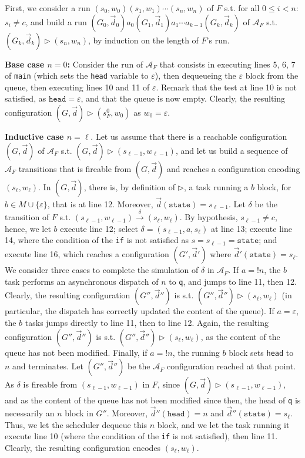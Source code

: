 \documentclass[runningheads,oribibl,]{article}
\newcommand{\Aa}{\ensuremath{\mathcal{A}}\xspace}
\newcommand{\e}{\ensuremath{\varepsilon}\xspace}
\newcommand{\Graph}{\ensuremath{G}}
\newcommand{\Data}{\ensuremath{\vec{d}}}
\newenvironment{proof}{\noindent{\it Proof.\hspace*{.5cm}}}{}
\begin{document}
\begin{proof}
  First, we consider a run $(s_0,w_0)(s_1,w_1)\cdots(s_n,w_n)$ of $F$
  s.t. for all $0\leq i<n$: $s_i\neq c$, and build a run
  $(\Graph_0,\Data_0)a_0(\Graph_1,\Data_1)a_1\cdots
  a_{k-1}(\Graph_k,\Data_k)$ of $\Aa_F$
  s.t. $(\Graph_k,\Data_k)\rhd(s_n,w_n)$, by induction on the length
  of $F$'s run.

  \textbf{Base case $n=0$:} Consider the run of $\Aa_F$ that consists
  in executing lines 5, 6, 7 of \texttt{main} (which sets the
  \texttt{head} variable to $\e$), then dequeueing the $\e$ block from
  the queue, then executing lines 10 and 11 of $\e$. Remark that the
  test at line 10 is not satisfied, as $\mathtt{head}=\e$, and that
  the queue is now empty. Clearly, the resulting configuration
  $(\Graph,\Data)\rhd(s^0_F,w_0)$ as $w_0=\e$.

  \textbf{Inductive case $n=\ell$}. Let us assume that there is a
  reachable configuration $(\Graph, \Data)$ of $\Aa_F$
  s.t. $(\Graph,\Data)\rhd (s_{\ell-1}, w_{\ell-1})$, and let us build
  a sequence of $\Aa_F$ transitions that is fireable from
  $(\Graph,\Data)$ and reaches a configuration encoding
  $(s_\ell,w_\ell)$. In $(\Graph,\Data)$, there is, by definition of
  $\rhd$, a task running a $b$ block, for $b\in M\cup\{\e\}$, that is
  at line 12. Moreover, $\Data(\mathtt{state})=s_{\ell-1}$. Let
  $\delta$ be the transition of $F$
  s.t. $(s_{\ell-1},w_{\ell-1})\xrightarrow{\delta}(s_\ell,w_\ell)$. By
  hypothesis, $s_{\ell-1}\neq c$, hence, we let $b$ execute line 12;
  select $\delta=(s_{\ell-1},a,s_\ell)$ at line 13; execute line 14,
  where the condition of the \texttt{if} is not satisfied as
  $s=s_{\ell-1}=\mathtt{state}$; and execute line 16, which reaches a
  configuration $(\Graph',\Data')$ where
  $\Data'(\mathtt{state})=s_\ell$. We consider three cases to complete
  the simulation of $\delta$ in $\Aa_F$. If $a=!n$, the $b$ task
  performs an asynchronous dispatch of $n$ to \texttt{q}, and jumps to
  line 11, then 12. Clearly, the resulting configuration
  $(\Graph'',\Data'')$ is s.t. $(\Graph'',\Data'')\rhd(s_\ell,w_\ell)$
  (in particular, the dispatch has correctly updated the content of
  the queue). If $a=\e$, the $b$ tasks jumps directly to line 11, then
  to line 12. Again, the resulting configuration $(\Graph'',\Data'')$
  is s.t. $(\Graph'',\Data'')\rhd(s_\ell,w_\ell)$, as the content of
  the queue has not been modified. Finally, if $a=!n$, the running $b$
  block sets \texttt{head} to $n$ and terminates. Let
  $(\Graph'',\Data'')$ be the $\Aa_F$ configuration reached at that
  point. As $\delta$ is fireable from $(s_{\ell-1},w_{\ell-1})$ in $F$,
  since $(\Graph, \Data)\rhd(s_{\ell-1},w_{\ell-1})$, and as the
  content of the queue has not been modified since then, the head of
  \texttt{q} is necessarily an $n$ block in $\Graph''$. Moreover,
  $\Data''(\mathtt{head})=n$ and
  $\Data''(\mathtt{state})=s_\ell$. Thus, we let the scheduler dequeue
  this $n$ block, and we let the task running it execute line 10
  (where the condition of the \texttt{if} is not satisfied), then line
  11. Clearly, the resulting configuration encodes $(s_\ell, w_\ell)$.
  \medskip


\end{proof}
\end{document}
